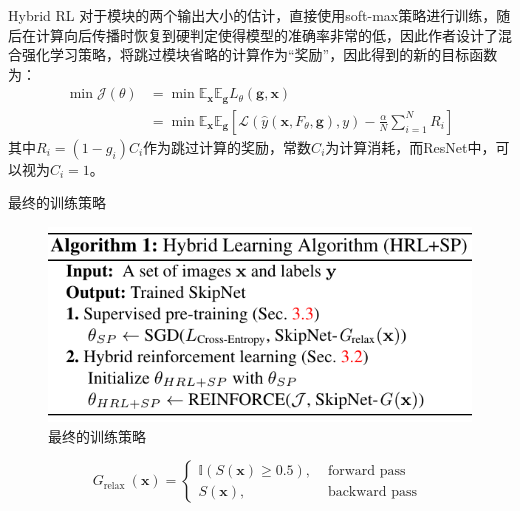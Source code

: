\documentclass[UTF8, fontset=founder, aspectratio=43, 10pt, t]{ctexbeamer}
\begin{document}
\begin{frame}{Hybrid RL}
	对于模块的两个输出大小的估计，直接使用soft-max策略进行训练，随后在计算向后传播时恢复到硬判定使得模型的准确率非常的低，因此作者设计了混合强化学习策略，将跳过模块省略的计算作为“奖励”，因此得到的新的目标函数为：
	\begin{equation}
	\begin{aligned} \min \mathcal{J}(\theta) &=\min \mathbb{E}_{\mathbf{x}} \mathbb{E}_{\mathbf{g}} L_{\theta}(\mathbf{g}, \mathbf{x}) \\ &=\min \mathbb{E}_{\mathbf{x}} \mathbb{E}_{\mathbf{g}}\left[\mathcal{L}\left(\hat{y}\left(\mathbf{x}, F_{\theta}, \mathbf{g}\right), y\right)-\frac{\alpha}{N} \sum_{i=1}^{N} R_{i}\right] \end{aligned}
	\end{equation}
	其中$R_{i}=\left(1-g_{i}\right) C_{i}$作为跳过计算的奖励，常数$C_{i}$为计算消耗，而ResNet中，可以视为$C_{i}=1$。
	
\end{frame}

\begin{frame}{最终的训练策略}
	\begin{figure}
		\centering
		\includegraphics[width=0.7\linewidth]{Images/hrl}
		\caption{最终的训练策略}
		\label{fig:hrl}
	\end{figure}
	$$
	G_{\text {relax }}(\mathbf{x})=\left\{\begin{aligned} \mathbb{I}(S(\mathbf{x}) \geq 0.5), & \text { forward pass } \\ S(\mathbf{x}), & \text { backward pass } \end{aligned}\right.
	$$
\end{frame}
\end{document}

